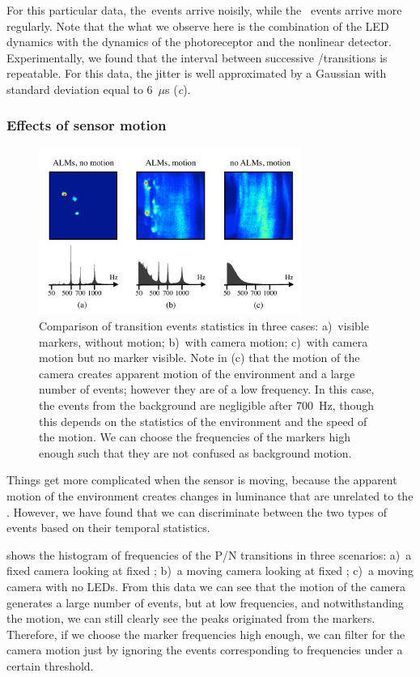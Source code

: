 For this particular data, the~\pP events arrive noisily, while the~\pN
events arrive more regularly. Note that the what we observe here is
the combination of the LED dynamics with the dynamics of the photoreceptor
and the nonlinear detector. Experimentally, we found that the interval
between successive \pP/\pN transitions is repeatable. For this data,
the jitter is well approximated by a Gaussian with standard deviation
equal to $6$~$\mu$s (\emph{c}).


\subsubsection{Effects of sensor motion\label{sub:Alternate-events-and-motion}}

\begin{figure}[b]
\centering{}\includegraphics[width=8.6cm]{figures/slides/motion_small}\caption{\label{fig:switch-hist}Comparison of transition events statistics
in three cases: a)~visible markers, without motion; b)~with camera
motion; c)~with camera motion but no marker visible. Note in (c)
that the motion of the camera creates apparent motion of the environment
and a large number of events; however they are of a low frequency.
In this case, the events from the background are negligible after
$700$~Hz, though this depends on the statistics of the environment
and the speed of the motion. We can choose the frequencies of the
markers high enough such that they are not confused as background
motion.}
\end{figure}


Things get more complicated when the sensor is moving, because the
apparent motion of the environment creates changes in luminance that
are unrelated to the \ALMs. However, we have found that we can discriminate
between the two types of events based on their temporal statistics.

 shows the histogram of frequencies of
the P/N transitions in three scenarios: a)~a fixed camera looking
at fixed \ALMs; b)~a moving camera looking at fixed \ALMs; c)~a
moving camera with no LEDs. From this data we can see that the motion
of the camera generates a large number of events, but at low frequencies,
and notwithstanding the motion, we can still clearly see the peaks
originated from the markers. Therefore, if we choose the marker frequencies
high enough, we can filter for the camera motion just by ignoring
the events corresponding to frequencies under a certain threshold. 
